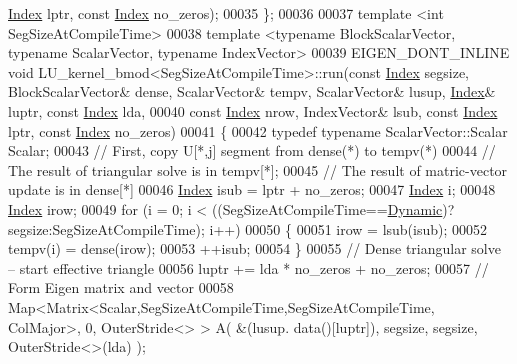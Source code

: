 \begin{DoxyCode}
      \hyperlink{namespace_eigen_a62e77e0933482dafde8fe197d9a2cfde}{Index} lptr, \textcolor{keyword}{const} \hyperlink{namespace_eigen_a62e77e0933482dafde8fe197d9a2cfde}{Index} no\_zeros);
00035 \};
00036 
00037 \textcolor{keyword}{template} <\textcolor{keywordtype}{int} SegSizeAtCompileTime>
00038 \textcolor{keyword}{template} <\textcolor{keyword}{typename} BlockScalarVector, \textcolor{keyword}{typename} ScalarVector, \textcolor{keyword}{typename} IndexVector>
00039 EIGEN\_DONT\_INLINE \textcolor{keywordtype}{void} LU\_kernel\_bmod<SegSizeAtCompileTime>::run(\textcolor{keyword}{const} \hyperlink{namespace_eigen_a62e77e0933482dafde8fe197d9a2cfde}{Index} segsize, 
      BlockScalarVector& dense, ScalarVector& tempv, ScalarVector& lusup, \hyperlink{namespace_eigen_a62e77e0933482dafde8fe197d9a2cfde}{Index}& luptr, \textcolor{keyword}{const} 
      \hyperlink{namespace_eigen_a62e77e0933482dafde8fe197d9a2cfde}{Index} lda,
00040                                                                   \textcolor{keyword}{const} \hyperlink{namespace_eigen_a62e77e0933482dafde8fe197d9a2cfde}{Index} nrow, IndexVector& lsub,
       \textcolor{keyword}{const} \hyperlink{namespace_eigen_a62e77e0933482dafde8fe197d9a2cfde}{Index} lptr, \textcolor{keyword}{const} \hyperlink{namespace_eigen_a62e77e0933482dafde8fe197d9a2cfde}{Index} no\_zeros)
00041 \{
00042   \textcolor{keyword}{typedef} \textcolor{keyword}{typename} ScalarVector::Scalar Scalar;
00043   \textcolor{comment}{// First, copy U[*,j] segment from dense(*) to tempv(*)}
00044   \textcolor{comment}{// The result of triangular solve is in tempv[*]; }
00045     \textcolor{comment}{// The result of matric-vector update is in dense[*]}
00046   \hyperlink{namespace_eigen_a62e77e0933482dafde8fe197d9a2cfde}{Index} isub = lptr + no\_zeros; 
00047   \hyperlink{namespace_eigen_a62e77e0933482dafde8fe197d9a2cfde}{Index} i;
00048   \hyperlink{namespace_eigen_a62e77e0933482dafde8fe197d9a2cfde}{Index} irow;
00049   \textcolor{keywordflow}{for} (i = 0; i < ((SegSizeAtCompileTime==\hyperlink{namespace_eigen_ad81fa7195215a0ce30017dfac309f0b2}{Dynamic})?segsize:SegSizeAtCompileTime); i++)
00050   \{
00051     irow = lsub(isub); 
00052     tempv(i) = dense(irow); 
00053     ++isub; 
00054   \}
00055   \textcolor{comment}{// Dense triangular solve -- start effective triangle}
00056   luptr += lda * no\_zeros + no\_zeros; 
00057   \textcolor{comment}{// Form Eigen matrix and vector }
00058   Map<Matrix<Scalar,SegSizeAtCompileTime,SegSizeAtCompileTime, ColMajor>, 0, OuterStride<> > A( &(lusup.
      data()[luptr]), segsize, segsize, OuterStride<>(lda) );

\end{DoxyCode}
